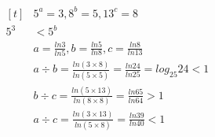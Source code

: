 \documentclass[class=ctexart,crop=false]{standalone}
\begin{document}
$\begin{aligned}[t]
    &5^a=3,8^b=5,13^c=8\\
    5^3&<5^b\\
    &a=\frac{ln3}{ln5},b=\frac{ln5}{ln8},c=\frac{ln8}{ln13}\\
    &a\div b=\frac{ln(3\times 8)}{ln(5\times 5)}=\frac{ln24}{ln25}=log_{25}24<1\\
    &b\div c=\frac{ln(5\times 13)}{ln(8\times 8)}=\frac{ln65}{ln64}>1\\
    &a\div c=\frac{ln(3\times 13)}{ln(5\times 8)}=\frac{ln39}{ln40}<1\\
\end{aligned}$
\end{document}
